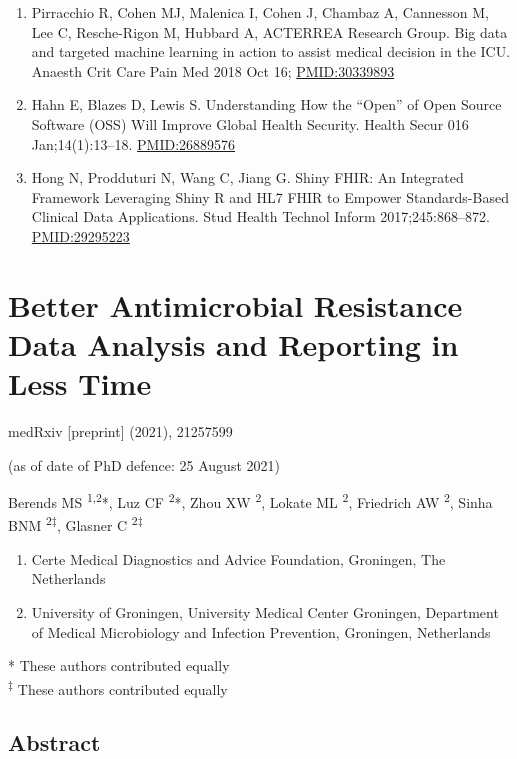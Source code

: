 \documentclass[
]{book}
\providecommand{\tightlist}{%
  \setlength{\itemsep}{0pt}\setlength{\parskip}{0pt}}
\begin{document}
\begin{enumerate}
\item
  Pirracchio R, Cohen MJ, Malenica I, Cohen J, Chambaz A, Cannesson M, Lee C, Resche-Rigon M, Hubbard A, ACTERREA Research Group. Big data and targeted machine learning in action to assist medical decision in the ICU. Anaesth Crit Care Pain Med 2018 Oct 16; \url{PMID:30339893}
\item
  Hahn E, Blazes D, Lewis S. Understanding How the ``Open'' of Open Source Software (OSS) Will Improve Global Health Security. Health Secur 016 Jan;14(1):13--18. \url{PMID:26889576}
\item
  Hong N, Prodduturi N, Wang C, Jiang G. Shiny FHIR: An Integrated Framework Leveraging Shiny R and HL7 FHIR to Empower Standards-Based Clinical Data Applications. Stud Health Technol Inform 2017;245:868--872. \url{PMID:29295223}
\end{enumerate}

\hypertarget{ch06-radar2}{%
\chapter{Better Antimicrobial Resistance Data Analysis and Reporting in Less Time}\label{ch06-radar2}}

medRxiv {[}preprint{]} (2021), 21257599

(as of date of PhD defence: 25 August 2021)

Berends MS \textsuperscript{1,2}*, Luz CF \textsuperscript{2}*, Zhou XW \textsuperscript{2}, Lokate ML \textsuperscript{2}, Friedrich AW \textsuperscript{2}, Sinha BNM \textsuperscript{2‡}, Glasner C \textsuperscript{2‡}

\begin{enumerate}
\def\labelenumi{\arabic{enumi}.}
\tightlist
\item
  Certe Medical Diagnostics and Advice Foundation, Groningen, The Netherlands
\item
  University of Groningen, University Medical Center Groningen, Department of Medical Microbiology and Infection Prevention, Groningen, Netherlands
\end{enumerate}

* These authors contributed equally\\
\textsuperscript{‡} These authors contributed equally

\hypertarget{abstract-4}{%
\section*{Abstract}\label{abstract-4}}
\end{document}
